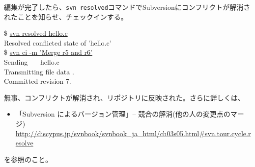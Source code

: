 \documentclass[a4j]{jsbook}
\newcommand{\prompt}{\$ }
\newenvironment{commandline2}{%
  \begin{tcolorbox}\tt%
}{%
  \end{tcolorbox}%
}
\begin{document}
編集が完了したら、{\tt svn resolved}コマンドでSubversionにコンフリクトが解消されたことを知らせ、チェックインする。
\begin{commandline2}
\prompt \underline{svn resolved hello.c} \\
Resolved conflicted state of 'hello.c' \\
\prompt \underline{svn ci -m 'Merge r5 and r6'} \\
Sending \ \ \ hello.c \\
Transmitting file data . \\
Committed revision 7.
\end{commandline2} \noindent
無事、コンフリクトが解消され、リポジトリに反映された。さらに詳しくは、
\begin{itemize}
  \item 「Subversion によるバージョン管理」-- 競合の解消(他の人の変更点のマージ) \\
    {\footnotesize \url{http://discypus.jp/svnbook/svnbook_ja_html/ch03s05.html#svn.tour.cycle.resolve}}
\end{itemize}
を参照のこと。
  

\end{document}
